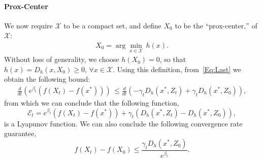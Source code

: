\documentclass[11pt]{article}
\theoremstyle{plain}
\newcommand{\E}{{\mathcal E}}
\newcommand{\X}{{\mathcal X}}
\begin{document}
\paragraph{Prox-Center}  We now require $\X$ to be a compact set,  and  define $X_0$ to be the ``prox-center,'' of $\X$:
\begin{align*}
X_0 = \arg\min_{x \in \X} \,h(x).
\end{align*}
Without loss of generality, we choose $h(X_0) = 0$, so that $h(x) =D_h(x,X_0) \geq 0, \, \forall x \in \X$.
Using this definition, from~\eqref{Eq:Last} we obtain the following bound:
%
\begin{align*}
 \frac{d}{dt}\left( e^{\beta_t}\left(f(X_t) - f(x^\ast)\right)\right) \,\leq  \frac{d}{dt} \left( -\gamma_t D_h(x^\ast,Z_t) + \gamma_t D_h(x^\ast, Z_0) \right) ,
\end{align*}
from which we can conclude that the following function, 
\begin{equation}
\E_t = e^{\beta_t}( f(X_t) - f(x^\ast)) + \gamma_t (D_h(x^\ast, Z_t) - D_h(x^\ast, Z_0)),
\end{equation}
is a Lyapunov function. We can also conclude the following convergence rate guarantee, 
\begin{equation}\label{Eq:DualAvgBound}
f(X_t) - f(X_0) \leq \frac{\gamma_t D_h(x^\ast,Z_0)}{e^{\beta_t}}.
\end{equation}
\end{document}
